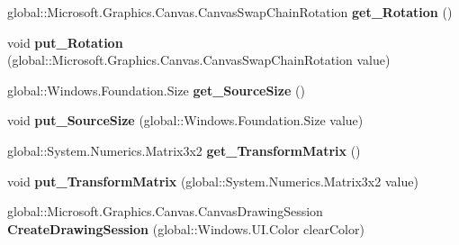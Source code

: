 \begin{DoxyCompactItemize}
global\+::\+Microsoft.\+Graphics.\+Canvas.\+Canvas\+Swap\+Chain\+Rotation {\bfseries get\+\_\+\+Rotation} ()
\item 
\mbox{\label{interface_microsoft_1_1_graphics_1_1_canvas_1_1_i_canvas_swap_chain_a931e117cf8d541e0154abccf052807fb}} 
void {\bfseries put\+\_\+\+Rotation} (global\+::\+Microsoft.\+Graphics.\+Canvas.\+Canvas\+Swap\+Chain\+Rotation value)
\item 
\mbox{\label{interface_microsoft_1_1_graphics_1_1_canvas_1_1_i_canvas_swap_chain_ae2841a44387495cf2aecbadd50cae216}} 
global\+::\+Windows.\+Foundation.\+Size {\bfseries get\+\_\+\+Source\+Size} ()
\item 
\mbox{\label{interface_microsoft_1_1_graphics_1_1_canvas_1_1_i_canvas_swap_chain_a2d4805496ff1ec4619b1157a60720971}} 
void {\bfseries put\+\_\+\+Source\+Size} (global\+::\+Windows.\+Foundation.\+Size value)
\item 
\mbox{\label{interface_microsoft_1_1_graphics_1_1_canvas_1_1_i_canvas_swap_chain_ad0ee43ededec68f0e33cd0f0ce1cbb35}} 
global\+::\+System.\+Numerics.\+Matrix3x2 {\bfseries get\+\_\+\+Transform\+Matrix} ()
\item 
\mbox{\label{interface_microsoft_1_1_graphics_1_1_canvas_1_1_i_canvas_swap_chain_a28c5d9ed4784f66f247e9176d9ab4e33}} 
void {\bfseries put\+\_\+\+Transform\+Matrix} (global\+::\+System.\+Numerics.\+Matrix3x2 value)
\item 
\mbox{\label{interface_microsoft_1_1_graphics_1_1_canvas_1_1_i_canvas_swap_chain_ad982604c4c691d7ca1af93bcd60455f2}} 
global\+::\+Microsoft.\+Graphics.\+Canvas.\+Canvas\+Drawing\+Session {\bfseries Create\+Drawing\+Session} (global\+::\+Windows.\+U\+I.\+Color clear\+Color)
\item 
\mbox{\label{interface_microsoft_1_1_graphics_1_1_canvas_1_1_i_canvas_swap_chain_a31ac623b91f0f24a54eaa1f47475c056}} 

\end{DoxyCompactItemize}
